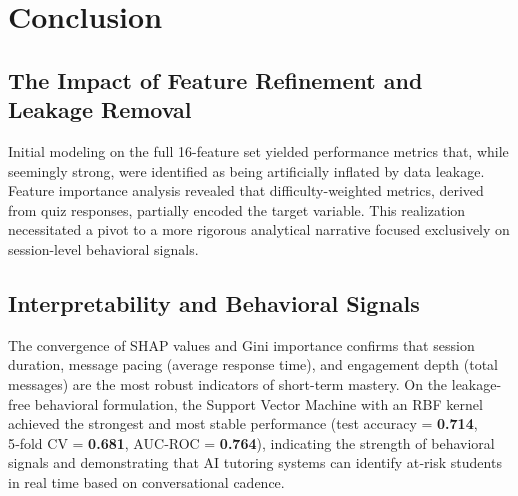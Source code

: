 \documentclass[conference]{IEEEtran}
\begin{document}
\section{Conclusion}

\subsection {The Impact of Feature Refinement and Leakage Removal}

Initial modeling on the full 16-feature set yielded performance metrics that, while seemingly strong, were identified as being artificially inflated by data leakage. Feature importance analysis revealed that difficulty-weighted metrics, derived from quiz responses, partially encoded the target variable. This realization necessitated a pivot to a more rigorous analytical narrative focused exclusively on session-level behavioral signals.

\subsection{Interpretability and Behavioral Signals}

The convergence of SHAP values and Gini importance confirms that session duration, message pacing (average response time), and engagement depth (total messages) are the most robust indicators of short-term mastery. On the leakage-free behavioral formulation, the Support Vector Machine with an RBF kernel achieved the strongest and most stable performance (test accuracy = \textbf{0.714}, 5‑fold CV = \textbf{0.681}, AUC‑ROC = \textbf{0.764}), indicating the strength of behavioral signals and demonstrating that AI tutoring systems can identify at‑risk students in real time based on conversational cadence.





\end{document}
